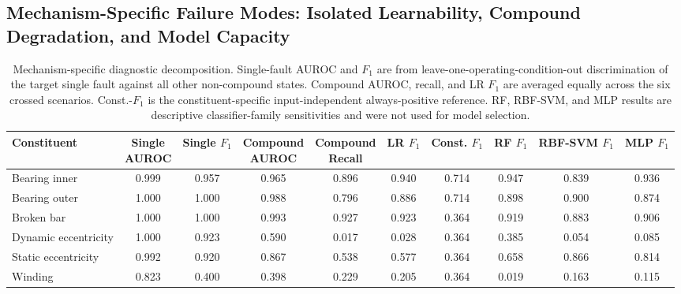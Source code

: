 \documentclass{ieeeaccess}
\begin{document}
\subsection{Mechanism-Specific Failure Modes: Isolated Learnability,
Compound Degradation, and Model Capacity}
\label{subsec:mechanism_failure_modes}
\begin{table}[t]
\caption{Mechanism-specific diagnostic decomposition. Single-fault AUROC and
$F_1$ are from leave-one-operating-condition-out discrimination of the target
single fault against all other non-compound states. Compound AUROC, recall,
and LR $F_1$ are averaged equally across the six crossed scenarios.
Const.-$F_1$ is the constituent-specific input-independent always-positive
reference. RF, RBF-SVM, and MLP results are descriptive classifier-family
sensitivities and were not used for model selection.}
\label{tab:constituent_failure_modes}
\centering
\footnotesize
\setlength{\tabcolsep}{3pt}
\begin{tabular}{lccccccccc}
\toprule
Constituent &
\makecell{Single\\AUROC} &
\makecell{Single\\$F_1$} &
\makecell{Compound\\AUROC} &
\makecell{Compound\\Recall} &
\makecell{LR\\$F_1$} &
\makecell{Const.\\$F_1$} &
\makecell{RF\\$F_1$} &
\makecell{RBF-SVM\\$F_1$} &
\makecell{MLP\\$F_1$} \\
\midrule

Bearing inner
& 0.999 & 0.957 & 0.965 & 0.896 & 0.940 & 0.714 & 0.947 & 0.839 & 0.936 \\

Bearing outer
& 1.000 & 1.000 & 0.988 & 0.796 & 0.886 & 0.714 & 0.898 & 0.900 & 0.874 \\

Broken bar
& 1.000 & 1.000 & 0.993 & 0.927 & 0.923 & 0.364 & 0.919 & 0.883 & 0.906 \\

Dynamic eccentricity
& 1.000 & 0.923 & 0.590 & 0.017 & 0.028 & 0.364 & 0.385 & 0.054 & 0.085 \\

Static eccentricity
& 0.992 & 0.920 & 0.867 & 0.538 & 0.577 & 0.364 & 0.658 & 0.866 & 0.814 \\

Winding
& 0.823 & 0.400 & 0.398 & 0.229 & 0.205 & 0.364 & 0.019 & 0.163 & 0.115 \\

\bottomrule
\end{tabular}
\end{table}
\end{document}
